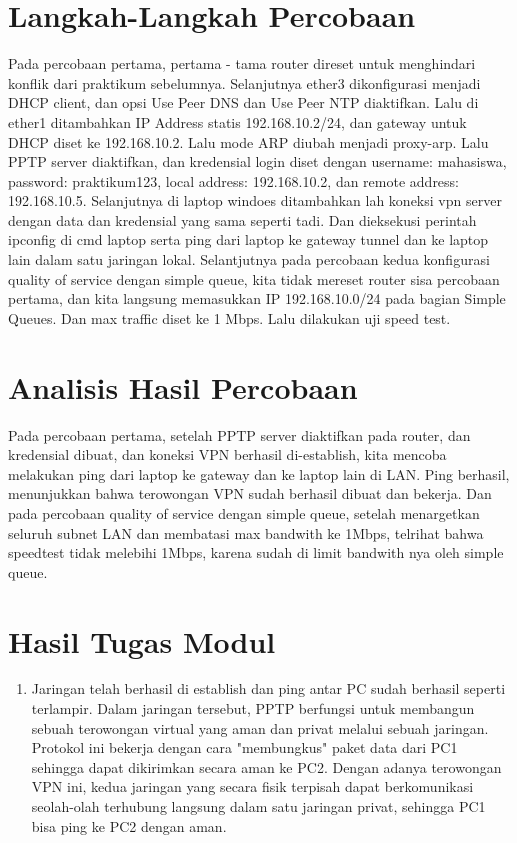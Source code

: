 \section{Langkah-Langkah Percobaan}
Pada percobaan pertama, pertama - tama router direset untuk menghindari konflik dari praktikum sebelumnya. Selanjutnya ether3 dikonfigurasi menjadi DHCP client, dan opsi Use Peer DNS dan Use Peer NTP diaktifkan. Lalu di ether1 ditambahkan IP Address statis 192.168.10.2/24, dan gateway untuk DHCP diset ke 192.168.10.2. Lalu mode ARP diubah menjadi proxy-arp. Lalu PPTP server diaktifkan, dan kredensial login diset dengan username: mahasiswa, password: praktikum123, local address: 192.168.10.2, dan remote address: 192.168.10.5. Selanjutnya di laptop windoes ditambahkan lah koneksi vpn server dengan data dan kredensial yang sama seperti tadi. Dan dieksekusi perintah ipconfig di cmd laptop serta ping dari laptop ke gateway tunnel dan ke laptop lain dalam satu jaringan lokal. Selantjutnya pada percobaan kedua konfigurasi quality of service dengan simple queue, kita tidak mereset router sisa percobaan pertama, dan kita langsung memasukkan IP 192.168.10.0/24 pada bagian Simple Queues. Dan max traffic diset ke 1 Mbps. Lalu dilakukan uji speed test.


\section{Analisis Hasil Percobaan}
Pada percobaan pertama, setelah PPTP server diaktifkan pada router, dan kredensial dibuat, dan koneksi VPN berhasil di-establish, kita mencoba melakukan ping dari laptop ke gateway dan ke laptop lain di LAN. Ping berhasil, menunjukkan bahwa terowongan VPN sudah berhasil dibuat dan bekerja. Dan pada percobaan quality of service dengan simple queue, setelah menargetkan seluruh subnet LAN dan membatasi max bandwith ke 1Mbps, telrihat bahwa speedtest tidak melebihi 1Mbps, karena sudah di limit bandwith nya oleh simple queue. 

\section{Hasil Tugas Modul}
\begin{enumerate}
	\item Jaringan telah berhasil di establish dan ping antar PC sudah berhasil seperti terlampir. Dalam jaringan tersebut, PPTP berfungsi untuk membangun sebuah terowongan virtual yang aman dan privat melalui sebuah jaringan. Protokol ini bekerja dengan cara "membungkus" paket data dari PC1 sehingga dapat dikirimkan secara aman ke PC2. Dengan adanya terowongan VPN ini, kedua jaringan yang secara fisik terpisah dapat berkomunikasi seolah-olah terhubung langsung dalam satu jaringan privat, sehingga PC1 bisa ping ke PC2 dengan aman.
\end{enumerate}

